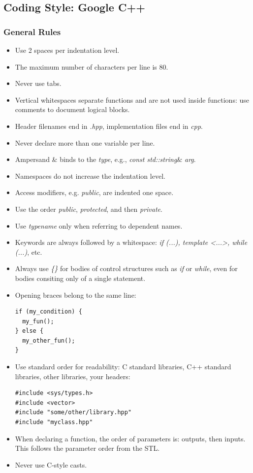 \documentclass[oneside,a4paper,titlepage]{scrartcl}              %
\begin{document}
\subsection{Coding Style: Google C++}

\subsubsection{General Rules}
\begin{itemize}
  \item Use 2 spaces per indentation level.
  \item The maximum number of characters per line is 80.
  \item Never use tabs.
  \item Vertical whitespaces separate functions and are not used inside functions: use comments to document logical blocks.
  \item Header filenames end in \emph{.hpp}, implementation files end in \emph{cpp}.
  \item Never declare more than one variable per line.
  \item Ampersand {\&} binds to the \emph{type}, e.g., \emph{const std::string}\& \emph{arg}.
  \item Namespaces do not increase the indentation level.
  \item Access modifiers, e.g. \emph{public}, are indented one space.
  \item Use the order \emph{public}, \emph{protected}, and then \emph{private}.
  \item Use \emph{typename} only when referring to dependent names.
  \item Keywords are always followed by a whitespace: \emph{if (...), template \textless...\textgreater, while (...)}, etc.
  \item Always use \emph{\{\}} for bodies of control structures such as \emph{if} or \emph{while}, even for bodies consiting only of a single statement.
  \item Opening braces belong to the same line:
  \begin{lstlisting}
if (my_condition) {
  my_fun();
} else {
  my_other_fun();
}
  \end{lstlisting}
  \item Use standard order for readability: C standard libraries, C++ standard libraries, other libraries, your headers:
  \begin{lstlisting}
#include <sys/types.h>
#include <vector>
#include "some/other/library.hpp"
#include "myclass.hpp"
  \end{lstlisting}
  \item When declaring a function, the order of parameters is: outputs, then inputs. This follows the parameter order from the STL.
  \item Never use C-style casts.
\end{itemize}
\end{document}
